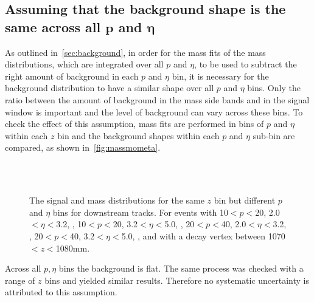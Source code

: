 \subsection[Assuming that the background shape is the same across all $p$ and $\eta$]{Assuming that the background shape is the same across all $\mathbold{p}$ and $\mathbold{\eta}$}
As outlined in~\autoref{sec:background}, in order for the mass fits of the \KS mass distributions, which are integrated over all $p$ and $\eta$, to be used to subtract the right amount of background in each $p$ and $\eta$ bin, it is necessary for the background distribution to have a similar shape over all $p$ and $\eta$ bins. Only the ratio between the amount of background in the mass side bands and in the signal window is important and the level of background can vary across these bins. To check the effect of this assumption, mass fits are performed in bins of $p$ and $\eta$ within each $z$ bin and the background shapes within each $p$ and $\eta$ sub-bin are compared, as shown in~\autoref{fig:massmometa}.
\begin{figure}
\begin{center}

 
    \\
    \\
 

\end{center}
\caption{The signal and mass distributions for the same $z$ bin but different $p$ and $\eta$ bins for downstream tracks. For events with 10$<p<$20\gevc, 2.0$<\eta<$3.2, \protect{}, 10$<p<$20\gevc, 3.2$<\eta<$5.0, \protect{}, 20$<p<$40\gevc, 2.0$<\eta<$3.2, \protect{}, 20$<p<$40\gevc, 3.2$<\eta<$5.0, \protect{}, and with a decay vertex between 1070$<z<$1080\:mm.           
  \label{fig:massmometa}}
\end{figure}
Across all $p,\eta$ bins the background is flat. The same process was checked with a range of $z$ bins and yielded similar results. Therefore no systematic uncertainty is attributed to this assumption. 

